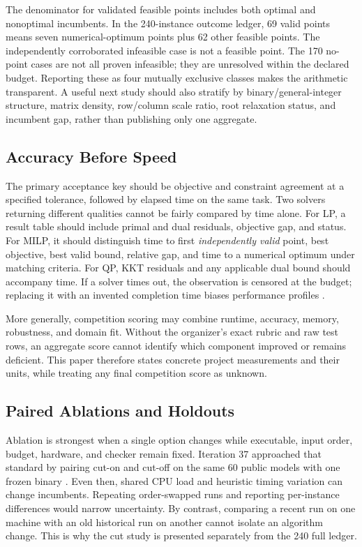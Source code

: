 \documentclass[10pt,a4paper,twocolumn]{article}
\begin{document}
The denominator for validated feasible points includes both optimal and nonoptimal incumbents. In the 240-instance outcome ledger, 69 valid points means seven numerical-optimum points plus 62 other feasible points. The independently corroborated infeasible case is not a feasible point. The 170 no-point cases are not all proven infeasible; they are unresolved within the declared budget. Reporting these as four mutually exclusive classes makes the arithmetic transparent. A useful next study should also stratify by binary/general-integer structure, matrix density, row/column scale ratio, root relaxation status, and incumbent gap, rather than publishing only one aggregate.

\subsection{Accuracy Before Speed}

The primary acceptance key should be objective and constraint agreement at a specified tolerance, followed by elapsed time on the same task. Two solvers returning different qualities cannot be fairly compared by time alone. For LP, a result table should include primal and dual residuals, objective gap, and status. For MILP, it should distinguish time to first \emph{independently valid} point, best objective, best valid bound, relative gap, and time to a numerical optimum under matching criteria. For QP, KKT residuals and any applicable dual bound should accompany time. If a solver times out, the observation is censored at the budget; replacing it with an invented completion time biases performance profiles \cite{dolanmore2002}.

More generally, competition scoring may combine runtime, accuracy, memory, robustness, and domain fit. Without the organizer's exact rubric and raw test rows, an aggregate score cannot identify which component improved or remains deficient. This paper therefore states concrete project measurements and their units, while treating any final competition score as unknown.

\subsection{Paired Ablations and Holdouts}

Ablation is strongest when a single option changes while executable, input order, budget, hardware, and checker remain fixed. Iteration 37 approached that standard by pairing cut-on and cut-off on the same 60 public models with one frozen binary \cite{iter37}. Even then, shared CPU load and heuristic timing variation can change incumbents. Repeating order-swapped runs and reporting per-instance differences would narrow uncertainty. By contrast, comparing a recent run on one machine with an old historical run on another cannot isolate an algorithm change. This is why the cut study is presented separately from the 240 full ledger.
\end{document}
